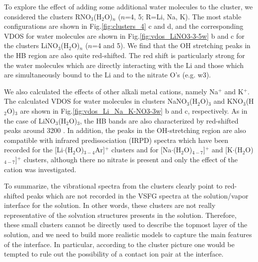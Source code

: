To explore the effect of adding some additional water molecules to
the cluster, we considered the clusters RNO$_3$(H$_2$O)$_n$ ($n$=4, 5; R=Li, Na, K).
The most stable configurations are shown in Fig.\thinspace\ref{fig:clusters_4} c and d,
and the corresponding VDOS for water molecules are shown in
Fig.\thinspace\ref{fig:vdos_LiNO3-3-5w} b and c for the clusters LiNO$_3$(H$_2$O)$_n$
($n$=4 and 5). We find that the OH stretching peaks in the HB region are also quite red-shifted.
The red shift is particularly strong for the water molecules which are directly interacting with
the Li and those which are simultaneously bound to the Li and to the nitrate O's (e.g. w3).

%

We also calculated the effects of other alkali metal cations, namely Na$^+$ and K$^+$. 
The calculated VDOS for water molecules in clusters NaNO$_3$(H$_2$O)$_3$ and KNO$_3$(H$_2$O)$_3$ are shown in 
Fig.\thinspace\ref{fig:vdos_Li_Na_K-NO3-3w} b and c, respectively. As in the case of LiNO$_3$(H$_2$O)$_3$, the HB 
bands are also characterized by red-shifted peaks around 3200 \centimeter.
In addition, the peaks in the OH-stretching region are also compatible with infrared predissociation
(IRPD) spectra which have been recorded for the [Li$\cdot$(H$_2$O)$_{3-4}$Ar]$^+$
clusters\cite{rodriguez2011, Miller2008, Miller2008b}
and for [Na$\cdot$(H$_2$O)$_{4-7}$]$^+$ and [K$\cdot$(H$_2$O)$_{4-7}$]$^+$ clusters\cite{beck2011}, although there no
nitrate is present and only the effect of the cation was investigated.

To summarize, the vibrational spectra from the clusters clearly point to red-shifted peaks which are not 
recorded in the VSFG spectra at the solution/vapor interface for the \LiN solution. 
In other words, these clusters are not really representative of the solvation structures presents in the \LiN solution.
Therefore, these small clusters cannot be directly used to describe the topmost layer of the \LiN solution, 
and we need to build more realistic models to capture the main features of the interface. 
In particular, according to the cluster picture one would be tempted to rule out the possibility of a contact 
ion pair at the interface.

